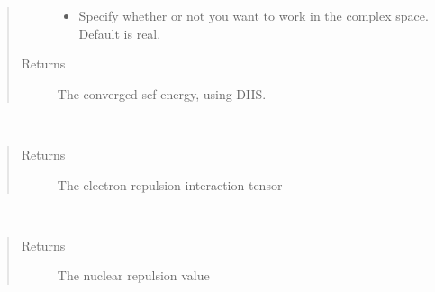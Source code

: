 \documentclass[letterpaper,10pt,english]{sphinxmanual}
\begin{document}
\begin{fulllineitems}
\begin{fulllineitems}
\begin{quote}
\begin{description}
\begin{itemize}
\item {} 
 \textendash{} Specify whether or not you want to work in the complex space. Default is real.

\end{itemize}

\item[{Returns}] \leavevmode
The converged scf energy, using DIIS.

\end{description}\end{quote}

\end{fulllineitems}


\begin{fulllineitems}
\label{\detokenize{RHF:hf.RHF.RHF.get_two_e}}~\begin{quote}\begin{description}
\item[{Returns}] \leavevmode
The electron repulsion interaction tensor

\end{description}\end{quote}

\end{fulllineitems}


\begin{fulllineitems}
\label{\detokenize{RHF:hf.RHF.RHF.nuc_rep}}~\begin{quote}\begin{description}
\item[{Returns}] \leavevmode
The nuclear repulsion value

\end{description}\end{quote}

\end{fulllineitems}



\end{fulllineitems}
\end{document}
